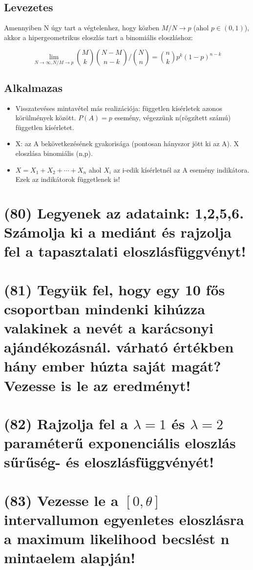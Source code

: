 \documentclass[12p]{article}
\begin{document}
\subsection{Levezetes}

Amennyiben N úgy tart a végtelenhez, hogy közben $M/N \rightarrow p$ (ahol $p \in (0,1)$), akkor a hipergeometrikus eloszlás tart a binomiális eloszláshoz:

$$\lim_{N \rightarrow \infty, N/M \rightarrow p} {M \choose k}{{N - M} \choose {n - k}}/{N \choose n} = {n \choose k}p^k(1-p)^{n-k}$$

\subsection{Alkalmazas}
\begin{itemize}
\item Visszatevéses mintavétel más realizációja: független kísérletek azonos körülmények között. $P(A) = p$ esemény, végezzünk n(rögzített számú) független kísérletet.
\item X: az A bekövetkezésének gyakorisága (pontosan hányszor jött ki az A). X eloszlása binomiális (n,p).
\item $X = X_1 + X_2 + \cdots + X_n$ ahol $X_i$ az i-edik kísérletnél az A esemény indikátora. Ezek az indikátorok függetlenek is!

\end{itemize}

\section{(80) Legyenek az adataink: 1,2,5,6. Számolja ki a mediánt és rajzolja fel a tapasztalati eloszlásfüggvényt!}

\section{(81) Tegyük fel, hogy egy 10 fős csoportban mindenki kihúzza valakinek a nevét a karácsonyi ajándékozásnál. várható értékben hány ember húzta saját magát? Vezesse is le az eredményt!}

\section{(82) Rajzolja fel a $\lambda = 1$ és $\lambda = 2$ paraméterű exponenciális eloszlás sűrűség- és eloszlásfüggvényét!}

\section{(83) Vezesse le a $[0, \theta]$ intervallumon egyenletes eloszlásra a maximum likelihood becslést n mintaelem alapján!}
\end{document}
